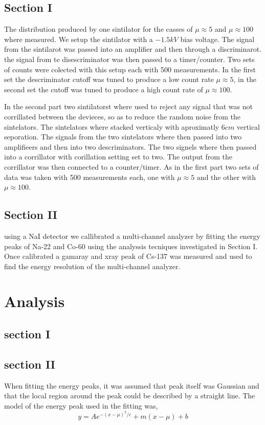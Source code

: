 \documentclass[%
 reprint,
 amsmath,amssymb,
 aps,
]{revtex4-1}
\begin{document}
\subsection{Section I}
The distribution produced by one sintilator for the casses of $\mu\approx5$ and $\mu\approx100$ where measured. We setup the sintilator with a $-1.5kV$ bias voltage. The signal from the sintilarot was passed into an amplifier and then through a discriminarot. the signal from te disescriminator was then passed to a timer/counter. Two sets of counts were colected with this setup each with 500 measurements. In the first set the descriminator cutoff was tuned to produce a low count rate $\mu\approx5$, in the second set the cutoff was tuned to produce a high count rate of $\mu\approx100$.

In the second part two sintilatorst where used to reject any signal that was not corrillated between the devieces, so as to reduce the random noise from the sintelators. The sintelators where stacked verticaly with aproximatly $6cm$ vertical seporation. The signals from the two sintelators where then passed into two amplifieers and then into two descriminators. The two signels where then passed into a corrillator with corillation setting set to two. The output from the corrillator was then connected to a counter/timer. As in the first part two sets of data was taken with 500 measurements each, one with $\mu\approx5$ and the other with $\mu\approx100$.

\subsection{Section II}
using a NaI detector we callibrated a multi-channel analyzer by fitting the energy peaks of Na-22 and Co-60 using the analyssis tecniques investigated in Section I. Once calibrated a gamaray and xray peak of Cs-137 was measured and used to find the energy resolution of the multi-channel analyzer.

\section{Analysis}
\subsection{section I}


\subsection{section II}
When fitting the energy peaks, it was assumed that peak itself was Gaussian and that the local region around the peak could be described by a straight line. The model of the energy peak used in the fitting was,
\[
y = A e^{-(x - \mu)^2/c} + m (x - \mu) + b
\]
\end{document}
